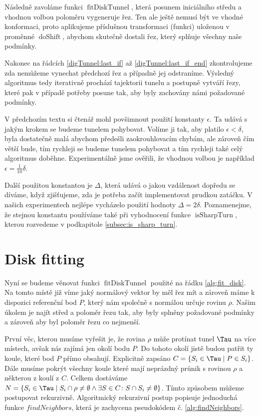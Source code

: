 Následně zavoláme funkci $ \operatorname{fitDiskTunnel} $, která posunem iniciálního
středu a vhodnou volbou poloměru vygeneruje řez. Ten ale ještě nemusí být ve vhodné
konformaci, proto aplikujeme příslušnou transformaci (funkci) uloženou v proměnné
$ \operatorname{doShift} $, abychom skutečně dostali řez, který splňuje všechny
naše podmínky.

Nakonec na řádcích \ref{digTunnel:last_if} až \ref{digTunnel:last_if_end}
zkontrolujeme zda nemůžeme vynechat předchozí řez a případně jej odstraníme.
Výsledný algoritmus tedy iterativně prochází tajektorii tunelu a postupně vytváří řezy,
které pak v případě potřeby posune tak, aby byly zachovány námi požadované podmínky.

V předchozím textu si čtenář mohl povšimnout použití konstanty $ \epsilon $.
Ta udává s jakým krokem se budeme tunelem pohybovat.
Volíme ji tak, aby platilo  $ \epsilon < \delta $, byla dostatečně malá abychom
předešli zaokrouhlovacím chybám, ale zároveň čím větší bude, tím rychleji se
budeme tunelem pohybovat a tím rychleji také celý algoritmus doběhne. Experimentálně
jsme ověřili, že vhodnou volbou je například $ \epsilon = \frac{1}{10} \delta $.

Další použitou konstantou je $ \Delta $, která udává o jakou vzdálenost dopředu
se díváme, když zjišťujeme, zda je potřeba začít implementovat prudkou zatáčku.
V našich experimentech nejlépe vycházelo použití hodnoty $ \Delta = 2 \delta $.
Poznamenejme, že stejnou konstantu používáme také při vyhodnocení funkce
$ \operatorname{isSharpTurn} $, kterou rozvedeme v podkapitole \ref{subsec:is_sharp_turn}.




\section{Disk fitting} \label{subsec:disk_fit}
Nyní se budeme věnovat funkci $ \operatorname{fitDiskTunnel} $ použité na řádku
\ref{alg:fit_disk}. Na tomto místě již víme jaký normálový vektor by měl řez mít a
zároveň máme k dispozici referenční bod $ P $, který nám společně s normálou
určuje rovinu $ \rho $. Našim úkolem je najít střed a poloměr řezu tak, aby
byly splněny požadované podmínky a zároveň aby byl poloměr řezu co nejmenší.

První věc, kterou musíme vyřešit je, že rovina $ \rho $ může protínat tunel $ \Tau $
na více místech, avšak nás zajímá jen okolí bodu $ P $. Do tohoto okolí jistě
budou patřit ty koule, které bod $ P $ přímo obsahují. Explicitně
zapsáno $ C = \{S_i \in \Tau \mid P \in S_i \} $. Dále musíme pokrýt všechny
koule které mají neprázdný průnik s rovinou $ \rho $ a některou z koulí z $ C $.
Celkem dostáváme
$ N = \{ S_i \in \Tau \mid S_i \cap \rho \neq \emptyset \wedge \exists S \in C \colon S \cap S_i \neq \emptyset  \}$.
Tímto způsobem můžeme postupovat rekurzivně. Algoritmický rekurzivní postup
popisuje jednoduchá funkce $ findNeighbors $, která je zachycena pseudokódem
č. \ref{alg:findNeighbors}.

